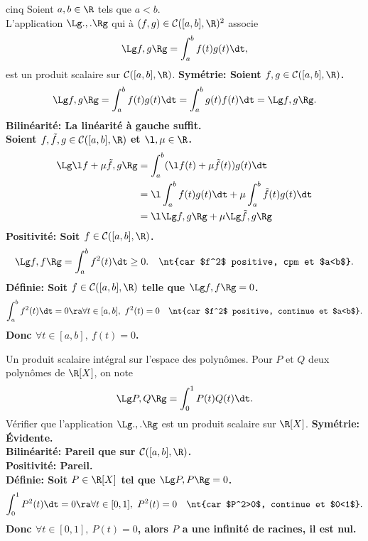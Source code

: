 \documentclass[11pt]{article}
\renewcommand*{\C}{\mathcal{C}}
\begin{document}
\begin{prop}{}{cinq}
    Soient $a,b\in\R$ tels que $a<b$.\\
    L'application $\Lg.,.\Rg$ qui à $(f,g)\in\C([a,b],\R)^2$ associe
    \begin{equation*}
        \Lg f,g \Rg = \int_a^bf(t)g(t)\dt,
    \end{equation*}
    est un produit scalaire sur $\C([a,b],\R)$.
    \tcblower
    \bf{Symétrie:} Soient $f,g\in\C([a,b],\R)$.
    \begin{equation*}
        \Lg f,g \Rg = \int_a^bf(t)g(t)\dt=\int_a^bg(t)f(t)\dt=\Lg f,g \Rg.
    \end{equation*}
    \bf{Bilinéarité:} La linéarité  à gauche suffit.\\
    Soient $f,\tilde{f},g\in\C([a,b],\R)$ et $\l,\mu\in\R$.
    \begin{align*}
        \Lg \l f + \mu \tilde{f}, g \Rg &= \int_a^b(\l f(t) + \mu \tilde{f}(t))g(t)\dt\\
        &= \l\int_a^bf(t)g(t)\dt+\mu\int_a^b\tilde{f}(t)g(t)\dt\\
        &= \l\Lg f, g \Rg + \mu \Lg \tilde{f}, g \Rg
    \end{align*}
    \bf{Positivité:} Soit $f\in\C([a,b],\R)$.
    \begin{equation*}
        \Lg f, f \Rg = \int_a^bf^2(t)\dt \geq 0. \quad \nt{car $f^2$ positive, cpm et $a<b$}.
    \end{equation*}
    \bf{Définie:} Soit $f\in\C([a,b],\R)$ telle que $\Lg f, f \Rg=0$.
    \begin{equation*}
        \int_a^b f^2(t)\dt = 0 \ra \forall t \in [a,b], ~ f^2(t)=0 \quad \nt{car $f^2$ positive, continue et $a<b$}.
    \end{equation*}
    Donc $\forall t \in [a,b], ~ f(t)=0$.
\end{prop}

\begin{ex}{Un produit scalaire intégral sur l'espace des polynômes.}{}
    Pour $P$ et $Q$ deux polynômes de $\R[X]$, on note
    \begin{equation*}
        \Lg P, Q \Rg = \int_0^1P(t)Q(t)\dt.
    \end{equation*}
    Vérifier que l'application $\Lg.,.\Rg$ est un produit scalaire sur $\R[X]$.
    \tcblower
    \bf{Symétrie:} Évidente.\\
    \bf{Bilinéarité:} Pareil que sur $\C([a,b],\R)$.\\
    \bf{Positivité:} Pareil.\\
    \bf{Définie:} Soit $P\in\R[X]$ tel que $\Lg P,P \Rg=0$.
    \begin{equation*}
        \int_0^1P^2(t)\dt=0 \ra \forall t \in [0,1], ~ P^2(t)=0 \quad \nt{car $P^2>0$, continue et $0<1$}.
    \end{equation*}
    Donc $\forall t \in [0,1], ~ P(t) = 0$, alors $P$ a une infinité de racines, il est \bf{nul}.
\end{ex}
\end{document}
